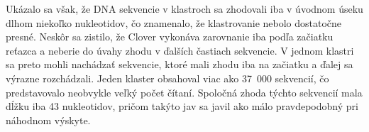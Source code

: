 Ukázalo sa však, že DNA sekvencie v klastroch sa zhodovali iba v úvodnom úseku dlhom niekoľko nukleotidov, čo znamenalo, že klastrovanie nebolo dostatočne presné.
Neskôr sa zistilo, že Clover vykonáva zarovnanie iba podľa začiatku reťazca a neberie do úvahy zhodu v ďalších častiach sekvencie. V jednom klastri sa preto mohli nachádzať sekvencie, ktoré mali zhodu iba na začiatku a ďalej sa výrazne rozchádzali.
Jeden klaster obsahoval viac ako 37~000 sekvencií, čo predstavovalo neobvykle veľký počet čítaní. Spoločná zhoda týchto sekvencií mala dĺžku iba 43 nukleotidov, pričom takýto jav sa javil ako málo pravdepodobný pri náhodnom výskyte.
